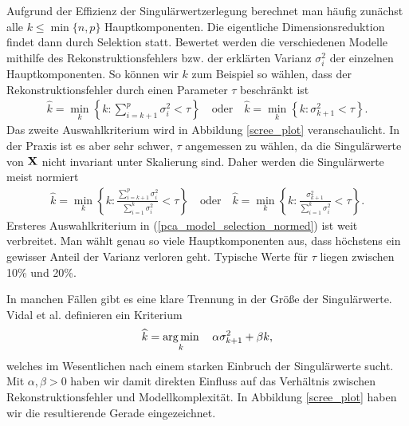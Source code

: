Aufgrund der Effizienz der Singulärwertzerlegung berechnet man häufig zunächst alle $k \leq \min\{n, p\}$ Hauptkomponenten. Die eigentliche Dimensionsreduktion findet dann durch Selektion statt. Bewertet werden die verschiedenen Modelle mithilfe des Rekonstruktionsfehlers bzw. der erklärten Varianz $\sigma_i^2$ der einzelnen Hauptkomponenten. So können wir $k$ zum Beispiel so wählen, dass der Rekonstruktionsfehler durch einen Parameter $\tau$ beschränkt ist
\begin{align}
\label{pca_model_selection}
\widehat{k} = \min_k \left\{k \colon \sum_{i = k+1}^{p} \sigma_i^2 < \tau \right\} \quad \text{oder} \quad \widehat{k} = \min_k \left\{k \colon \sigma_{k+1}^2 < \tau \right\}.
\end{align}
Das zweite Auswahlkriterium wird in Abbildung \ref{scree_plot} veranschaulicht. In der Praxis ist es aber sehr schwer, $\tau$ angemessen zu wählen, da die Singulärwerte von $\mathbf{X}$ nicht invariant unter Skalierung sind. Daher werden die Singulärwerte meist normiert
\begin{align}
\label{pca_model_selection_normed}
\widehat{k} = \min_k \left\{k \colon \frac{\sum_{i = k+1}^{p} \sigma_i^2}{\sum_{i=1}^k \sigma_i^2} < \tau \right\} \quad \text{oder} \quad \widehat{k} = \min_k \left\{k \colon \frac{\sigma_{k+1}^2}{\sum_{i=1}^k \sigma_i^2} < \tau \right\}.
\end{align}
Ersteres Auswahlkriterium in (\ref{pca_model_selection_normed}) ist weit verbreitet. Man wählt genau so viele Hauptkomponenten aus, dass höchstens ein gewisser Anteil der Varianz verloren geht. Typische Werte für $\tau$ liegen zwischen 10\% und 20\%. 

In manchen Fällen gibt es eine klare Trennung in der Größe der Singulärwerte. Vidal et al. \cite{vidal} definieren ein Kriterium
\begin{align}
\widehat{k} = \operatorname*{arg\,min}_{k} \quad \alpha\sigma_{k+1}^2 + \beta k,
\end{align}
welches im Wesentlichen nach einem starken Einbruch der Singulärwerte sucht. Mit $\alpha, \beta > 0$ haben wir damit direkten Einfluss auf das Verhältnis zwischen Rekonstruktionsfehler und Modellkomplexität. In Abbildung \ref{scree_plot} haben wir die resultierende Gerade eingezeichnet.

